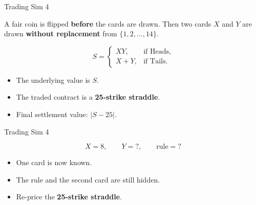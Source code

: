 \begin{frame}{Trading Sim 4}
  \begin{sqt:definition}
    A fair coin is flipped \textbf{before} the cards are drawn. Then two cards
    $X$ and $Y$ are drawn \textbf{without replacement} from
    $\{1,2,\dots,14\}$.
  \end{sqt:definition}

  \[
    S=
    \begin{cases}
      XY, & \text{if Heads},\\
      X+Y, & \text{if Tails.}
    \end{cases}
  \]

  \begin{itemize}
    \item The underlying value is $S$.
    \item The traded contract is a \textbf{25-strike straddle}.
    \item Final settlement value: $\lvert S-25\rvert$.
  \end{itemize}

\end{frame}

\begin{frame}{Trading Sim 4}
  \begin{center}
    \[
      X=8,\qquad Y=?,\qquad \text{rule}=?
    \]
  \end{center}

  \begin{itemize}
    \item One card is now known.
    \item The rule and the second card are still hidden.
    \item Re-price the \textbf{25-strike straddle}.
  \end{itemize}

\end{frame}

